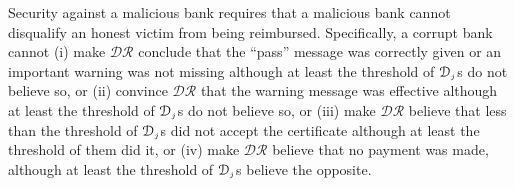 \begin{definition}[Security against a malicious victim]
{{\end{array} \hs\hs:
    \begin{array}{l}
  \hs\hs  \mathsf{Exp}_{\st 1}^{\st\mathcal{A}}(\mathsf{input})\hs\hs\hs\\
\end{array}    \right]$$
}}
%
where $\hat{\bm{w}}_{\st j}= [\hat {w}_{\st 1,j}, \hat{w}_{\st 2, j}, \hat{w}_{\st 3, j}, \hat{w}_{\st 4, j}]$, $\hat {\bm w}=[\hat {\bm w}_{\st 1},..., \hat{\bm w}_{\st n}]$, $\hat {\bm m}=[\hat {m}^{\st (\mathcal{C})}_{\st 1}, $ $\hat {m}^{\st (\mathcal{C})}_{\st 2}, $ $\hat {m}^{\st (\mathcal{B})}_{\st 1}, \hat {m}^{\st (\mathcal{B})}_{\st 2}]$, $(w_{\st 1, j},..., w_{\st 3, j})$ are the  decoding of   $(\hat w_{\st 1,j},...,$ $\hat w_{\st 3,j})\in\hat{\bm{w}}_{\st j}\in \hat {\bm w}$, and $\mathsf{input}:=(1^{\st\lambda},  {aux})$. 
%
%
\end{definition}



%
\vspace{-3.4mm}
Security against a malicious bank requires that a malicious bank cannot disqualify an honest victim from being reimbursed. 
%
Specifically,  a corrupt bank cannot  (i) make $\mathcal{DR}$ conclude that the  ``pass'' message was correctly given or an important warning was not missing although at least the threshold of $\mathcal{D}_{\scriptscriptstyle j}$s  do not believe so, or (ii) convince $\mathcal{DR}$  that the warning message was effective although at least the threshold of $\mathcal{D}_{\scriptscriptstyle j}$s do not believe so, or (iii) make $\mathcal{DR}$ believe that less than the threshold of $\mathcal{D}_{\scriptscriptstyle j}$s did not accept the certificate although at least the threshold of them did it, or (iv) make $\mathcal{DR}$ believe that no payment was made, although at least the threshold of $\mathcal{D}_{\scriptscriptstyle j}$s believe the opposite. 

